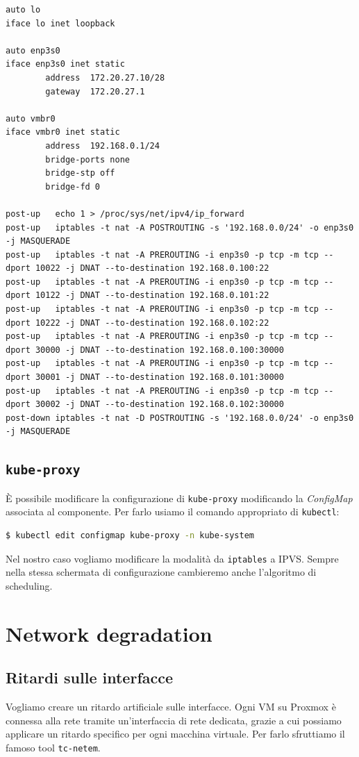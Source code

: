 \documentclass[12pt, hidelinks]{report}
\begin{document}
\begin{lstlisting}
auto lo
iface lo inet loopback

auto enp3s0
iface enp3s0 inet static
        address  172.20.27.10/28
        gateway  172.20.27.1

auto vmbr0
iface vmbr0 inet static
        address  192.168.0.1/24
        bridge-ports none
        bridge-stp off
        bridge-fd 0
        
post-up   echo 1 > /proc/sys/net/ipv4/ip_forward
post-up   iptables -t nat -A POSTROUTING -s '192.168.0.0/24' -o enp3s0 -j MASQUERADE
post-up   iptables -t nat -A PREROUTING -i enp3s0 -p tcp -m tcp --dport 10022 -j DNAT --to-destination 192.168.0.100:22
post-up   iptables -t nat -A PREROUTING -i enp3s0 -p tcp -m tcp --dport 10122 -j DNAT --to-destination 192.168.0.101:22
post-up   iptables -t nat -A PREROUTING -i enp3s0 -p tcp -m tcp --dport 10222 -j DNAT --to-destination 192.168.0.102:22
post-up   iptables -t nat -A PREROUTING -i enp3s0 -p tcp -m tcp --dport 30000 -j DNAT --to-destination 192.168.0.100:30000
post-up   iptables -t nat -A PREROUTING -i enp3s0 -p tcp -m tcp --dport 30001 -j DNAT --to-destination 192.168.0.101:30000
post-up   iptables -t nat -A PREROUTING -i enp3s0 -p tcp -m tcp --dport 30002 -j DNAT --to-destination 192.168.0.102:30000
post-down iptables -t nat -D POSTROUTING -s '192.168.0.0/24' -o enp3s0 -j MASQUERADE
\end{lstlisting}

\subsection{\texttt{kube-proxy}}
È possibile modificare la configurazione di \texttt{kube-proxy} modificando la \textit{ConfigMap} associata al componente. Per farlo usiamo il comando appropriato di \texttt{kubectl}:
\begin{lstlisting}[language=bash]
  $ kubectl edit configmap kube-proxy -n kube-system
\end{lstlisting}

Nel nostro caso vogliamo modificare la modalità da \texttt{iptables} a IPVS. Sempre nella stessa schermata di configurazione cambieremo anche l'algoritmo di scheduling. 

\section{Network degradation}

\subsection{Ritardi sulle interfacce}
Vogliamo creare un ritardo artificiale sulle interfacce. Ogni VM su Proxmox è connessa alla rete tramite un'interfaccia di rete dedicata, grazie a cui possiamo applicare un ritardo specifico per ogni macchina virtuale. Per farlo sfruttiamo il famoso tool \texttt{tc-netem}.
\end{document}
